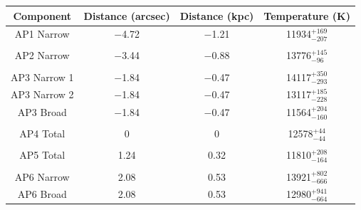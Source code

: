	\begin{table}
	\def\arraystretch{1.5}
	\centering
	\begin{tabular}{cccc}
	Component & Distance (arcsec) & Distance (kpc) & Temperature (K) \\ \hline
	AP1 Narrow   & $-$4.72                                                       & $-$1.21                                                    & 11934$^{+169}_{-207}$                                     \\
		&	&	&	\\
	AP2 Narrow   & $-$3.44                                                       & $-$0.88                                                    & 13776$^{+145}_{-96}$                                      \\
	&	&	&	\\
	AP3 Narrow 1 & $-$1.84                                                       & $-$0.47                                                    & 14117$^{+350}_{-293}$                                     \\
	AP3 Narrow 2 & $-$1.84                                                       & $-$0.47                                                    & 13117$^{+185}_{-228}$                                     \\
	AP3 Broad    & $-$1.84                                                       & $-$0.47                                                    & 11564$^{+204}_{-160}$                                     \\
	&	&	&	\\
	AP4 Total    & 0                                                           & 0                                                        & 12578$^{+44}_{-44}$                                       \\
	&	&	&	\\
	AP5 Total    & 1.24                                                        & 0.32                                                     & 11810$^{+208}_{-164}$                                     \\
	&	&	&	\\
	AP6 Narrow   & 2.08                                                        & 0.53                                                     & 13921$^{+802}_{-666}$                                     \\
	AP6 Broad    & 2.08                                                        & 0.53                                                     & 12980$^{+941}_{-664}$                                     \\

\end{tabular}
\end{table}
